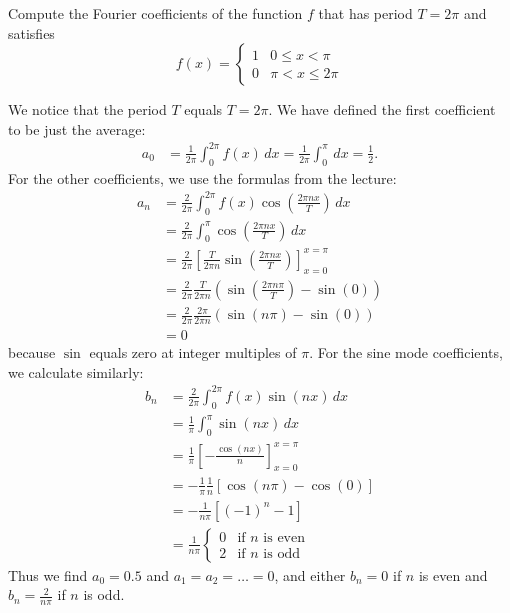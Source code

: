 \documentclass[11pt]{article}
\begin{document}
\begin{exercise}
    Compute the Fourier coefficients of the function $f$ that has period $T = 2\pi$ and satisfies
    \[
        f(x) = \left\{\begin{array}{ll} 1 & 0 \leq x < \pi \\ 0 & \pi < x \leq 2\pi \end{array}\right.
    \]
\end{exercise}
\begin{solution}     
    We notice that the period $T$ equals $T = 2\pi$. 
    We have defined the first coefficient to be just the average:
    \begin{align*}
        a_0 
        &= 
        \frac{1}{2\pi} \int_0^{2\pi} f(x) \, dx 
        = 
        \frac{1}{2\pi} \int_0^\pi \, dx  = \frac 1 2
        .
    \end{align*}
    For the other coefficients, we use the formulas from the lecture:
    \begin{align*}
        a_n 
        &= 
        \frac{2}{2\pi} \int_0^{2\pi} f(x) \cos\left(\frac{2\pi n x}{T}\right) \, dx 
        \\&= 
        \frac{2}{2\pi} \int_0^\pi \cos\left(\frac{2\pi n x}{T}\right) \, dx 
        \\
        &= 
        \frac{2}{2\pi} \left[ \frac{T}{2\pi n} \sin\left(\frac{2\pi n x}{T}\right) \right]_{x=0}^{x=\pi}
        \\&= 
        \frac{2}{2\pi} \frac{T}{2\pi n} \left( \sin\left(\frac{2\pi n \pi}{T}\right) - \sin(0) \right) 
        \\&= 
        \frac{2}{2\pi} \frac{2\pi}{2\pi n} \left( \sin\left(n \pi \right) - \sin(0) \right) 
        \\&= 
        0
    \end{align*}
    because $\sin$ equals zero at integer multiples of $\pi$.
    For the sine mode coefficients, we calculate similarly:
    \begin{align*}
        b_n 
        &= 
        \frac{2}{2\pi}
        \int_0^{2\pi} f(x) \sin(nx) \, dx 
        \\
        &= 
        \frac{1}{\pi}
        \int_0^\pi \sin(nx) \, dx 
        \\
        &= 
        \frac{1}{\pi}
        \left[-\frac{\cos(nx)}{n} \right]_{x=0}^{x=\pi} 
        \\
        &= 
        -
        \frac{1}{\pi}
        \frac{1}{n} \left[ \cos(n\pi) - \cos(0) \right] 
        \\
        &= 
        -
        \frac{1}{n\pi}
        \left[ (-1)^n - 1 \right] 
        \\
        &= 
        \frac{1}{n\pi}
        \begin{cases}
            0 & \text{if } n \text{ is even} 
            \\
            2 & \text{if } n \text{ is odd}
        \end{cases}
    \end{align*}
    Thus we find $a_0 = 0.5$ and $a_1 = a_2 = \dots = 0$,
    and either $b_n = 0$ if $n$ is even and $b_n = \frac{2}{n\pi}$ if $n$ is odd. 
\end{solution}
\end{document}
